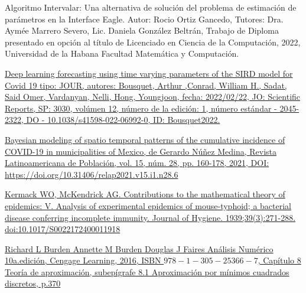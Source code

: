 \printbibliography[heading=bibintoc]

\label{sec:21}

\begin{itemize}

    \begin{thebibliography}

      {Algoritmo Intervalar: Una alternativa de solución del problema de estimación de parámetros en la Interface Eagle. Autor: Rocio Ortiz Gancedo, Tutores: Dra. Aymée Marrero Severo, Lic. Daniela González Beltrán, Trabajo de Diploma presentado en opción al título de Licenciado en Ciencia de la Computación, 2022, Universidad de la Habana Facultad Matemática y Computación.}
     \label{sec:1}

    \bibitem[2]{}\href{https://doi.org/10.1038/s41598-022-06992-0}{ Deep learning forecasting using time varying parameters of the SIRD model for Covid 19 tipo: JOUR, autores: Bousquet, Arthur ,Conrad, William H., Sadat, Said Omer, Vardanyan, Nelli, Hong, Youngjoon, fecha: 2022/02/22, JO: Scientific Reports, SP: 3030, volúmen 12, número de la edición: 1, número estándar   - 2045-2322, DO  - 10.1038/s41598-022-06992-0, ID: Bousquet2022.}
     \label{sec:2}

    \bibitem[3]{}  \href{https://www.redalyc.org/journal/3238/323864536006/html/}{Bayesian modeling of spatio temporal patterns of the cumulative incidence of COVID-19 in municipalities of Mexico, de Gerardo Núñez Medina, \href{https://revistarelap.org/index.php/relap}{ Revista Latinoamericana de Población}, vol. 15, núm. 28, pp. 160-178, 2021, DOI:  https://doi.org/10.31406/relap2021.v15.i1.n28.6}
      \label{sec:3}

    \bibitem[4]{}\href{https://www.semanticscholar.org/paper/Contributions-to-the-mathematical-theory-of-V.-of-a-Kermack-Mckendrick/7beba9b40b692c2daa9975861394aefddcbe602b}{ Kermack WO, McKendrick AG. Contributions to the mathematical theory of epidemics: V. Analysis of experimental epidemics of mouse-typhoid; a bacterial disease conferring incomplete immunity. Journal of Hygiene. 1939;39(3):271-288. doi:10.1017/S0022172400011918}
    \label{sec:4}
    
    \bibitem[5]{} \href{https://cengagelatam.editorialdc.com/}{ Richard L Burden Annette M Burden Douglas J Faires Análisis Numérico 10a.edición, Cengage Learning, 2016, ISBN $978-1-305-25366-7$, Capítulo 8 Teoría de aproximación, subepígrafe 8.1 Aproximación por mínimos cuadrados discretos,  p.370}
    \label{sec:5}



\end{thebibliography}
\end{itemize}
